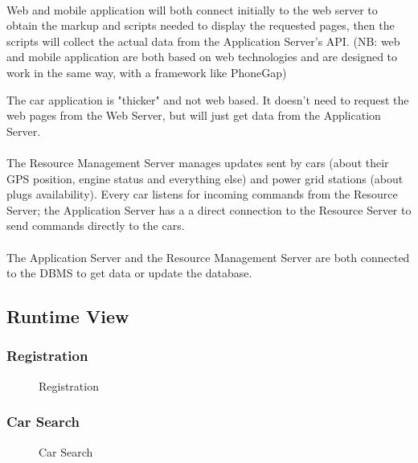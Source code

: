 \documentclass[english]{article}
\begin{document}
\paragraph{}
Web and mobile application will both connect initially to the web server to obtain the markup and scripts needed to display the requested pages, then the scripts will collect the actual data from the Application Server's API.
(NB: web and mobile application are both based on web technologies and are designed to work in the same way, with a framework like PhoneGap)

The car application is "thicker" and not web based. It doesn't need to request the web pages from the Web Server, but will just get data from the Application Server.

\paragraph{}
The Resource Management Server manages updates sent by cars (about their GPS position, engine status and everything else) and power grid stations (about plugs availability).
Every car listens for incoming commands from the Resource Server; the Application Server has a a direct connection to the Resource Server to send commands directly to the cars.

\paragraph{}
The Application Server and the Resource Management Server are both connected to the DBMS to get data or update the database.

\newpage
\subsection{Runtime View}

\subsubsection{Registration}
\begin{figure}[H]
	\centering
	\makebox[\textwidth][c]{
		\def\svgwidth{450pt}
		
	}
	\caption{Registration}
	\label{seq_registration}
\end{figure}

\subsubsection{Car Search}
\begin{figure}[H]
	\centering
	\makebox[\textwidth][c]{
		\def\svgwidth{450pt}
		
	}
	\caption{Car Search}
	\label{seq_carsearch}
\end{figure}
\end{document}
